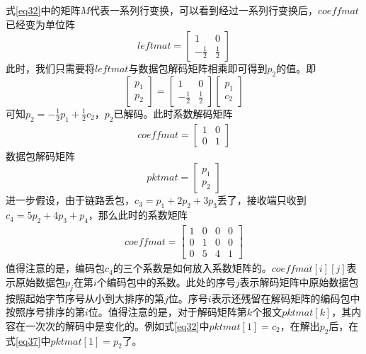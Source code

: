 式\ref{eq32}中的矩阵$M$代表一系列行变换，可以看到经过一系列行变换后，$coeffmat$已经变为单位阵
\begin{equation}\label{eq34}
leftmat = \left[ {\begin{array}{*{20}{c}}
	1&0\\
	{ - \frac{1}{2}}&{\frac{1}{2}} 
	\end{array}} \right]
\end{equation}
此时，我们只需要将$leftmat$与数据包解码矩阵相乘即可得到$p_{2}$的值。即
\begin{equation}\label{eq35}
\left[ {\begin{array}{*{20}{c}}
	{{p_1}}\\
	{{p_2}}
	\end{array}} \right] = \left[ {\begin{array}{*{20}{c}}
	1&0\\
	{ - \frac{1}{2}}&{\frac{1}{2}}
	\end{array}} \right]\left[ {\begin{array}{*{20}{c}}
	{{p_1}}\\
	{{c_2}}
	\end{array}} \right]
\end{equation}
可知$p_{2}=-\frac{1}{2}p_{1}+\frac{1}{2}c_{2}$，$p_{2}$已解码。此时系数解码矩阵
\begin{eqnarray}\label{eq36}
coeffmat=\left[ {\begin{array}{*{20}{c}}
	1&0\\
	0&1
	\end{array}} \right]
\end{eqnarray}
数据包解码矩阵
\begin{equation}\label{eq37}
pktmat = \left[ {\begin{array}{*{20}{c}}
	{{p_1}}\\
	{{p_2}}
	\end{array}} \right]
\end{equation}
进一步假设，由于链路丢包，$c_{3}=p_{1}+2p_{2}+3p_{3}$丢了，接收端只收到$c_{4}=5p_{2}+4p_{3}+p_{4}$，那么此时的系数矩阵
\begin{eqnarray}\label{eq38}
coeffmat=\left[ {\begin{array}{*{20}{c}}
	1&0&0&0\\
	0&1&0&0\\
	0&5&4&1
	\end{array}} \right]
\end{eqnarray}
值得注意的是，编码包$c_{4}$的三个系数是如何放入系数矩阵的。$coeffmat\left[i\right]\left[j\right]$表示原始数据包$p_{j}$在第$i$个编码包中的系数。此处的序号$j$表示解码矩阵中原始数据包按照起始字节序号从小到大排序的第$j$位。序号$i$表示还残留在解码矩阵的编码包中按照序号排序的第$i$位。值得注意的是，对于解码矩阵第$k$个报文$pktmat[k]$，其内容在一次次的解码中是变化的。例如式\ref{eq32}中$pktmat\left[1\right]=c_2$，在解出$p_2$后，在式\ref{eq37}中$pktmat\left[1\right]=p_{2}$了。
